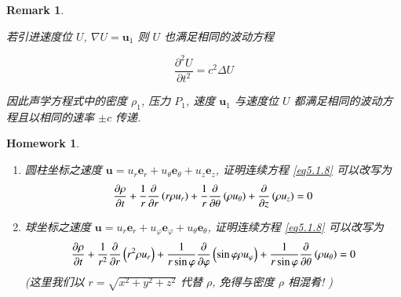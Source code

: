 \documentclass[11pt]{article}
\newtheorem{homework}{Homework}[section]
\newtheorem{remark}{Remark}[subsection]
\begin{document}
\begin{remark}
\begin{enumerate}
		若引进速度位 $ U $, $\nabla U = {\boldsymbol{u}_1}$ 则 $ U $ 也满足相同的波动方程
		
		\begin{equation}
		\frac{{{\partial ^2}U}}{{\partial {t^2}}} = {c^2}\Delta U
		\label{eq5.1.31}
		\end{equation}
		
		因此声学方程式中的密度 $ \rho_1 $, 压力 $ P_{1} $, 速度 $ \boldsymbol{u}_{1} $ 与速度位 $ U $ 都满足相同的波动方程且以相同的速率 $ \pm c$ 传递.
	\end{enumerate}
\end{remark}


\begin{homework}
	\text{}
	
	\vspace{-0.5cm}
	
	\begin{enumerate}
		\item 圆柱坐标之速度 $\boldsymbol{u} = {u_r}{\boldsymbol{e}_r} + {u_\theta }{\boldsymbol{e}_\theta } + {u_z}{\boldsymbol{e}_z}$, 证明连续方程 \ref{eq5.1.8} 可以改写为
		\begin{equation}
		\frac{{\partial \rho }}{{\partial t}} + \frac{1}{r}\frac{\partial }{{\partial r}}\left( {r\rho {u_r}} \right) + \frac{1}{r}\frac{\partial }{{\partial \theta }}\left( {\rho {u_\theta }} \right) + \frac{\partial }{{\partial z}}\left( {\rho {u_z}} \right) = 0
		\notag 
		\end{equation}
		\item 球坐标之速度 $\boldsymbol{u} = u{}_r{\boldsymbol{e}_r} + {u_\varphi }{\boldsymbol{e}_\varphi } + {u_\theta }{\boldsymbol{e}_\theta }$, 证明连续方程 \ref{eq5.1.8} 可以改写为
		\begin{equation}
		\frac{{\partial \rho }}{{\partial t}} + \frac{1}{{{r^2}}}\frac{\partial }{{\partial r}}\left( {{r^2}\rho {u_r}} \right) + \frac{1}{{r\sin \varphi }}\frac{\partial }{{\partial \varphi }}\left( {\sin \varphi \rho {u_\varphi }} \right) + \frac{1}{{r\sin \varphi }}\frac{\partial }{{\partial \theta }}\left( {\rho {u_\theta }} \right) = 0
		\notag
		\end{equation}
		(这里我们以 $r = \sqrt {{x^2} + {y^2} + {z^2}} $ 代替 $ \rho $, 免得与密度 $ \rho $ 相混肴! )
	\end{enumerate}
\label{hom5.1}
\end{homework}


\end{document}
